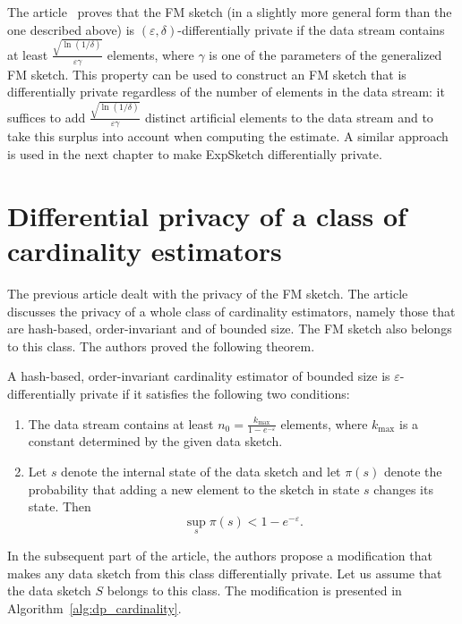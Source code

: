 The article~\cite{FM_itself_preserves_DF} proves that the FM sketch (in a slightly more general form than the one described above) is $(\varepsilon, \delta)$-differentially private if the data stream contains at least $\frac{\sqrt{\ln(1/\delta)}}{\varepsilon\gamma}$ elements, where $\gamma$ is one of the parameters of the generalized FM sketch. This property can be used to construct an FM sketch that is differentially private regardless of the number of elements in the data stream: it suffices to add $\frac{\sqrt{\ln(1/\delta)}}{\varepsilon\gamma}$ distinct artificial elements to the data stream and to take this surplus into account when computing the estimate. A similar approach is used in the next chapter to make ExpSketch differentially private.

\section{Differential privacy of a class of cardinality estimators}

The previous article dealt with the privacy of the FM sketch. The article~\cite{Order_Invariant_Cardinality_Estimators_Are_Differentially_Private} discusses the privacy of a whole class of cardinality estimators, namely those that are hash-based, order-invariant and of bounded size. The FM sketch also belongs to this class. The authors proved the following theorem.

\begin{theorem}
\label{theorem:general_DF_theorem}
A hash-based, order-invariant cardinality estimator of bounded size is $\varepsilon$-differentially private if it satisfies the following two conditions:
\begin{enumerate}
  \item The data stream contains at least $n_0 = \frac{k_{\max}}{1 - e^{-\varepsilon}}$ elements, where $k_{\max}$ is a constant determined by the given data sketch.
  \item Let $s$ denote the internal state of the data sketch and let $\pi(s)$ denote the probability that adding a new element to the sketch in state $s$ changes its state. Then
  \[
  \sup_s \pi(s) < 1 - e^{-\varepsilon}.
  \]
\end{enumerate}
\end{theorem}

In the subsequent part of the article, the authors propose a modification that makes any data sketch from this class differentially private. Let us assume that the data sketch $S$ belongs to this class. The modification is presented in Algorithm~\ref{alg:dp_cardinality}.

